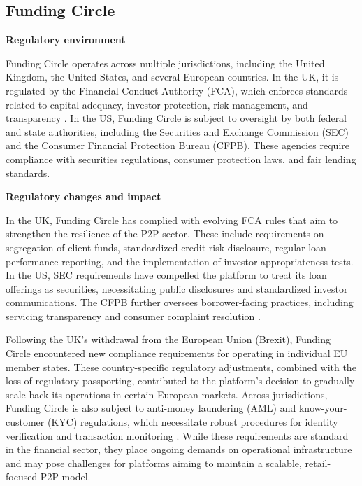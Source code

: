 \documentclass[pdflatex,sn-apa]{sn-jnl}%
\theoremstyle{thmstyleone}%
\theoremstyle{thmstyletwo}%
\theoremstyle{thmstylethree}%
\begin{document}
\subsection{Funding Circle}

\textbf{Regulatory environment}

Funding Circle operates across multiple jurisdictions, including the United Kingdom, the United States, and several European countries. In the UK, it is regulated by the Financial Conduct Authority (FCA), which enforces standards related to capital adequacy, investor protection, risk management, and transparency \citep{fca_home_2023}. In the US, Funding Circle is subject to oversight by both federal and state authorities, including the Securities and Exchange Commission (SEC) and the Consumer Financial Protection Bureau (CFPB). These agencies require compliance with securities regulations, consumer protection laws, and fair lending standards.

\textbf{Regulatory changes and impact}

In the UK, Funding Circle has complied with evolving FCA rules that aim to strengthen the resilience of the P2P sector. These include requirements on segregation of client funds, standardized credit risk disclosure, regular loan performance reporting, and the implementation of investor appropriateness tests. In the US, SEC requirements have compelled the platform to treat its loan offerings as securities, necessitating public disclosures and standardized investor communications. The CFPB further oversees borrower-facing practices, including servicing transparency and consumer complaint resolution \citep{cfpb_supervision_2023}.

Following the UK’s withdrawal from the European Union (Brexit), Funding Circle encountered new compliance requirements for operating in individual EU member states. These country-specific regulatory adjustments, combined with the loss of regulatory passporting, contributed to the platform’s decision to gradually scale back its operations in certain European markets. Across jurisdictions, Funding Circle is also subject to anti-money laundering (AML) and know-your-customer (KYC) regulations, which necessitate robust procedures for identity verification and transaction monitoring \citep{hm_treasury_improving_2024}. While these requirements are standard in the financial sector, they place ongoing demands on operational infrastructure and may pose challenges for platforms aiming to maintain a scalable, retail-focused P2P model.
\end{document}

